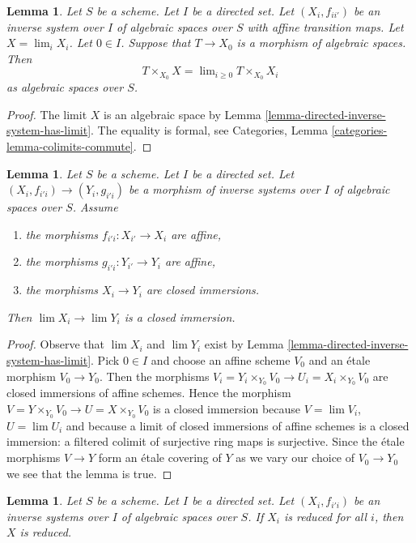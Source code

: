 \documentclass{stacks-project}
\theoremstyle{plain}
\newtheorem{lemma}[subsection]{Lemma}
\theoremstyle{definition}
\theoremstyle{remark}
\numberwithin{equation}{subsection}
\def\lim{\mathop{\mathrm{lim}}\nolimits}
\begin{document}
\begin{lemma}
\label{lemma-space-over-limit}
Let $S$ be a scheme. Let $I$ be a directed set.
Let $(X_i, f_{ii'})$ be an inverse system over $I$ of algebraic spaces
over $S$ with affine transition maps.
Let $X = \lim_i X_i$. Let $0 \in I$. Suppose that $T \to X_0$ is a
morphism of algebraic spaces. Then
$$
T \times_{X_0} X = \lim_{i \geq 0} T \times_{X_0} X_i
$$
as algebraic spaces over $S$.
\end{lemma}

\begin{proof}
The limit $X$ is an algebraic space by
Lemma \ref{lemma-directed-inverse-system-has-limit}.
The equality is formal, see
Categories, Lemma \ref{categories-lemma-colimits-commute}.
\end{proof}

\begin{lemma}
\label{lemma-directed-inverse-system-closed-immersions}
Let $S$ be a scheme. Let $I$ be a directed set.
Let $(X_i, f_{i'i}) \to (Y_i, g_{i'i})$ be a morphism
of inverse systems over $I$ of algebraic spaces over $S$.
Assume
\begin{enumerate}
\item the morphisms $f_{i'i} : X_{i'} \to X_i$ are affine,
\item the morphisms $g_{i'i} : Y_{i'} \to Y_i$ are affine,
\item the morphisms $X_i \to Y_i$ are closed immersions.
\end{enumerate}
Then $\lim X_i \to \lim Y_i$ is a closed immersion.
\end{lemma}

\begin{proof}
Observe that $\lim X_i$ and $\lim Y_i$ exist by
Lemma \ref{lemma-directed-inverse-system-has-limit}.
Pick $0 \in I$ and choose an affine scheme $V_0$ and an \'etale morphism
$V_0 \to Y_0$. Then the morphisms
$V_i = Y_i \times_{Y_0} V_0 \to U_i = X_i \times_{Y_0} V_0$
are closed immersions of affine schemes.
Hence the morphism $V = Y \times_{Y_0} V_0 \to U = X \times_{Y_0} V_0$
is a closed immersion because $V = \lim V_i$, $U = \lim U_i$
and because a limit of closed immersions of affine schemes is a
closed immersion: a filtered colimit of surjective ring maps
is surjective. Since the \'etale morphisms $V \to Y$ form an
\'etale covering of $Y$ as we vary our choice of $V_0 \to Y_0$
we see that the lemma is true.
\end{proof}

\begin{lemma}
\label{lemma-directed-inverse-system-reduced}
Let $S$ be a scheme. Let $I$ be a directed set.
Let $(X_i, f_{i'i})$ be an inverse systems over $I$
of algebraic spaces over $S$. If $X_i$ is reduced
for all $i$, then $X$ is reduced.
\end{lemma}
\end{document}
